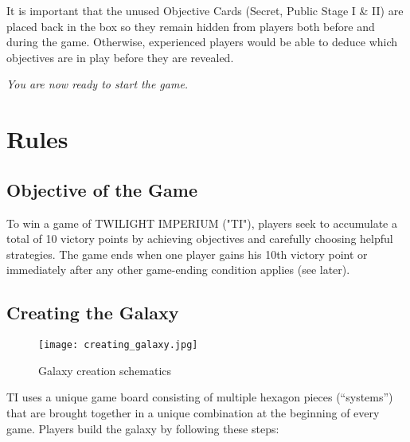 \documentclass[11pt,fleqn]{book} %
\begin{document}
\begin{STbox}   
     It is important that the unused Objective Cards (Secret, Public Stage I \& II) are placed back in the box so they remain hidden from players both before and during the game. Otherwise, experienced players would be able to deduce which objectives are in play before they are revealed.

\end{STbox} 

\emph{You are now ready to start the game.}



\chapter{Rules}

\section{Objective of the Game}
To win a game of TWILIGHT IMPERIUM ("TI"), players seek to accumulate a total of 10 victory points by achieving objectives and carefully choosing helpful strategies. The game ends when one player gains his 10th victory point or immediately after any other game-ending condition applies (see later).

\section{Creating the Galaxy}

\begin{figure}[!h!]
    \centering
    \texttt{[image: creating\_galaxy.jpg]}
    \caption{Galaxy creation schematics}
    \label{fig:galaxycreation}
\end{figure}
TI uses a unique game board consisting of multiple hexagon pieces (“systems”) that are brought together in a unique combination at the beginning of every game. Players build the galaxy by following these steps:
\end{document}
